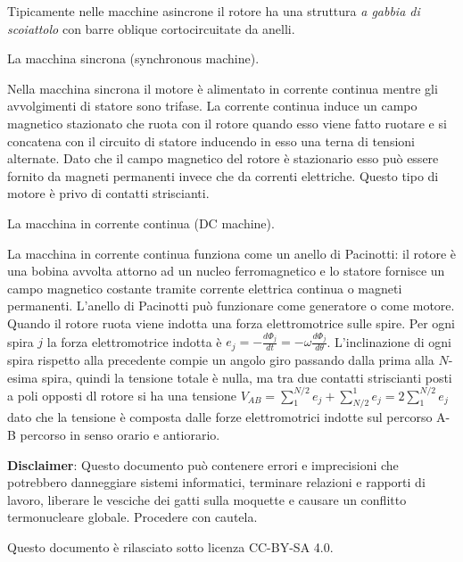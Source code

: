 \documentclass[answers, a4paper,12pt]{exam}
\begin{document}
\begin{questions}
\begin{solution}
		Tipicamente nelle macchine asincrone il rotore ha una struttura \textit{a gabbia di scoiattolo} con barre oblique cortocircuitate da anelli.  \end{solution}
	\question
	La macchina sincrona (synchronous machine).
	\begin{solution}Nella macchina sincrona il motore è alimentato in corrente continua mentre gli avvolgimenti di statore sono trifase. La corrente continua induce un campo magnetico stazionato che ruota con il rotore quando esso viene fatto ruotare e si concatena con il circuito di statore inducendo in esso una terna di tensioni alternate. Dato che il campo magnetico del rotore è stazionario esso può essere fornito da magneti permanenti invece che da correnti elettriche. Questo tipo di motore è privo di contatti striscianti. 
	\end{solution}
	\question
	La macchina in corrente continua (DC machine).
	\begin{solution}La macchina in corrente continua funziona come un anello di Pacinotti: il rotore è una bobina avvolta attorno ad un nucleo ferromagnetico e lo statore fornisce un campo magnetico costante tramite corrente elettrica continua o magneti permanenti. L'anello di Pacinotti può funzionare come generatore o come motore. Quando il rotore ruota viene indotta una forza elettromotrice sulle spire. Per ogni spira $j$ la forza elettromotrice indotta è $e_j = -\frac{d\Phi_j}{dt} = -\omega\frac{d\Phi_j}{d\theta}$. L'inclinazione di ogni spira rispetto alla precedente compie un angolo giro passando dalla prima alla $N$-esima spira, quindi la tensione totale è nulla, ma tra due contatti striscianti posti a poli opposti dl rotore si ha una tensione $V_{AB} = \sum_1^{N/2}e_j + \sum_{N/2}^1 e_j = 2 \sum_1^{N/2}e_j$ dato che la tensione è composta dalle forze elettromotrici indotte sul percorso A-B percorso in senso orario e antiorario.\end{solution}
\end{questions}
\textbf{Disclaimer}: Questo documento può contenere errori e imprecisioni che potrebbero danneggiare sistemi informatici, terminare relazioni e rapporti di lavoro, liberare le vesciche dei gatti sulla moquette e causare un conflitto termonucleare globale. Procedere con cautela.

Questo documento è rilasciato sotto licenza CC-BY-SA 4.0. \faCreativeCommons\ \faCreativeCommonsBy\ \faCreativeCommonsSa
\end{document}
